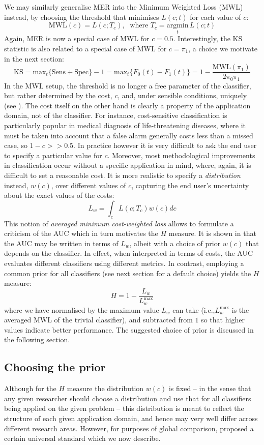 \documentclass{article}
\begin{document}
{We may similarly generalise MER into the Minimum Weighted Loss (MWL) instead, by choosing the threshold that minimises $L(c;t)$ for each value of $c$:
\[
\text{MWL}(c) = L(c;T_c), \; \text{ where }T_c = \underset{t}{\text{argmin}}\,L(c;t)
\]
Again, MER is now a special case of MWL for $c=0.5$. Interestingly, the KS statistic is also related to a special case of MWL for $c=\pi_1$, a choice we motivate in the next section:
\[
\text{KS} = \text{max}_t \{\text{Sens}+\text{Spec}\} -1 = \text{max}_t \{F_0(t)-F_1(t)\} = 1-\frac{\text{MWL}(\pi_1)}{2\pi_0 \pi_1}
\]
In the MWL setup, the threshold is no longer a free parameter of the classifier, but rather determined by the cost, $c$, and, under sensible conditions, uniquely (see \cite{hand2010a}). The cost itself on the other hand is clearly a property of the application domain, not of the classifier. For instance, cost-sensitive classification is particularly popular in medical diagnosis of life-threatening diseases, where it must be taken into account that a false alarm generally costs less than a missed case, so $1-c >> 0.5$. In practice  however it is very difficult to ask the end user to specify a particular value for $c$. Moreover, most methodological improvements in classification occur without a specific application in mind, where, again, it is difficult to set a reasonable cost.  It is more realistic to specify a \emph{distribution} instead, $w(c)$, over different values of $c$, capturing the end user's uncertainty about the exact values of the costs:
\[
L_w = \int_c L(c;T_c)w(c)dc
\]}
This notion of \emph{averaged minimum cost-weighted loss} allows to formulate a criticism of the AUC which in turn motivates the $H$ measure. It is shown in \cite{hand2009} that the AUC may be written in terms of $L_w$, albeit with a choice of prior $w(c)$ that depends on the classifier. In effect, when interpreted in terms of costs, the AUC  evaluates different classifiers using different metrics. In contrast, employing a common prior for all classifiers (see next section for a default choice) yields the $H$ measure:
\[
H = 1-\frac{L_w}{L_w^{\text{max}}}
\]
where we have normalised by the maximum value $L_w$ can take (i.e.,$L_w^{\text{max}}$ is the averaged MWL of the trivial classifier), and subtracted from $1$ so that higher values indicate better performance. The suggested choice of prior is discussed in the following section.


\subsection{Choosing the prior}
Although for the $H$ measure the distribution $w(c)$ is fixed -- in the sense that any given researcher should choose a distribution and use that for all classifiers being applied on the given problem -- this distribution is meant to reflect the structure of each given application domain, and hence may very well differ across different research areas. However, for purposes of global comparison, \cite{hand2012} proposed a certain universal standard which we now describe.
\end{document}
